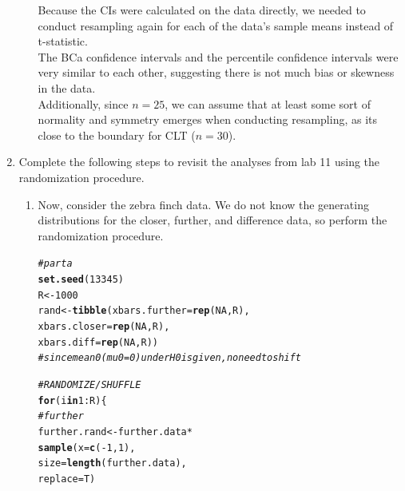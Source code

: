\documentclass{article}\usepackage[]{graphicx}\usepackage[]{xcolor}
\makeatletter
\newcommand{\hlnum}[1]{\textcolor[rgb]{0.686,0.059,0.569}{#1}}%
\newcommand{\hlcom}[1]{\textcolor[rgb]{0.678,0.584,0.686}{\textit{#1}}}%
\newcommand{\hlopt}[1]{\textcolor[rgb]{0,0,0}{#1}}%
\newcommand{\hldef}[1]{\textcolor[rgb]{0.345,0.345,0.345}{#1}}%
\newcommand{\hlkwa}[1]{\textcolor[rgb]{0.161,0.373,0.58}{\textbf{#1}}}%
\newcommand{\hlkwb}[1]{\textcolor[rgb]{0.69,0.353,0.396}{#1}}%
\newcommand{\hlkwc}[1]{\textcolor[rgb]{0.333,0.667,0.333}{#1}}%
\newcommand{\hlkwd}[1]{\textcolor[rgb]{0.737,0.353,0.396}{\textbf{#1}}}%
\newenvironment{kframe}{%
 \def\at@end@of@kframe{}%
 \ifinner\ifhmode%
  \def\at@end@of@kframe{\end{minipage}}%
  \begin{minipage}{\columnwidth}%
 \fi\fi%
 \def\FrameCommand##1{\hskip\@totalleftmargin \hskip-\fboxsep
 \colorbox{shadecolor}{##1}\hskip-\fboxsep
     \hskip-\linewidth \hskip-\@totalleftmargin \hskip\columnwidth}%
 \MakeFramed {\advance\hsize-\width
   \@totalleftmargin\z@ \linewidth\hsize
   \@setminipage}}%
 {\par\unskip\endMakeFramed%
 \at@end@of@kframe}
\newenvironment{knitrout}{}{} %
\makeatother
\begin{document}
\begin{enumerate}
\begin{enumerate}
Because the CIs were calculated on the data directly, we needed to conduct resampling again for each of the data's sample means instead of t-statistic. \\
The BCa confidence intervals and the percentile confidence intervals were very similar to each other, suggesting there is not much bias or skewness in the data. \\
Additionally, since $n=25$, we can assume that at least some sort of normality and symmetry emerges when conducting resampling, as its close to the boundary for CLT ($n=30$).
\end{enumerate}
\item Complete the following steps to revisit the analyses from lab 11 using the
randomization procedure.
\begin{enumerate}
\item Now, consider the zebra finch data. We do not know the generating distributions
for the closer, further, and difference data, so perform the randomization procedure. \\
\begin{knitrout}
\color{fgcolor}\begin{kframe}
\begin{alltt}
\hlcom{# part a}
\hlkwd{set.seed}\hldef{(}\hlnum{13345}\hldef{)}
\hldef{R} \hlkwb{<-} \hlnum{1000}
\hldef{rand} \hlkwb{<-} \hlkwd{tibble}\hldef{(}\hlkwc{xbars.further} \hldef{=} \hlkwd{rep}\hldef{(}\hlnum{NA}\hldef{, R),}
               \hlkwc{xbars.closer} \hldef{=} \hlkwd{rep}\hldef{(}\hlnum{NA}\hldef{, R),}
               \hlkwc{xbars.diff} \hldef{=} \hlkwd{rep}\hldef{(}\hlnum{NA}\hldef{, R))}
\hlcom{# since mean 0 (mu0 = 0) under H0 is given, no need to shift}

\hlcom{# RANDOMIZE / SHUFFLE}
\hlkwa{for}\hldef{(i} \hlkwa{in} \hlnum{1}\hlopt{:}\hldef{R)\{}
  \hlcom{# further}
  \hldef{further.rand} \hlkwb{<-} \hldef{further.data} \hlopt{*}
    \hlkwd{sample}\hldef{(}\hlkwc{x} \hldef{=} \hlkwd{c}\hldef{(}\hlopt{-}\hlnum{1}\hldef{,} \hlnum{1}\hldef{),}
           \hlkwc{size} \hldef{=} \hlkwd{length}\hldef{(further.data),}
           \hlkwc{replace} \hldef{= T)}


\end{alltt}
\end{kframe}
\end{knitrout}
\end{enumerate}
\end{enumerate}
\end{document}
